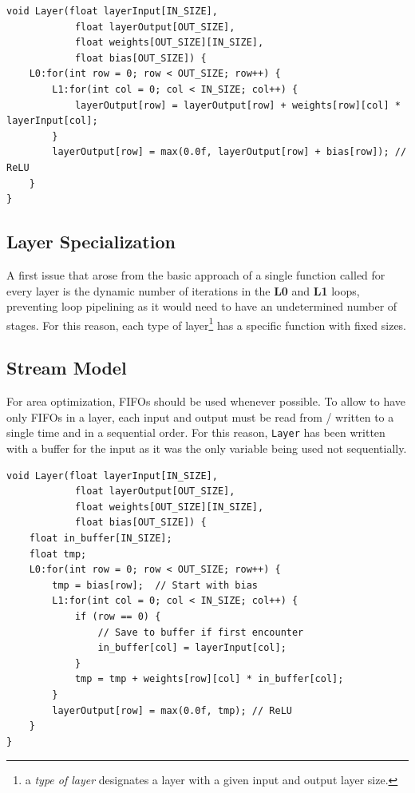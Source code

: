 \documentclass[11pt,a4paper]{article}
\begin{document}
\begin{listing}[htbp]
\begin{minipage}{\linewidth}
\begin{lstlisting}[style=cppstyle]
void Layer(float layerInput[IN_SIZE],
            float layerOutput[OUT_SIZE],
            float weights[OUT_SIZE][IN_SIZE],
            float bias[OUT_SIZE]) {
    L0:for(int row = 0; row < OUT_SIZE; row++) {
        L1:for(int col = 0; col < IN_SIZE; col++) {
            layerOutput[row] = layerOutput[row] + weights[row][col] * layerInput[col];
        }
        layerOutput[row] = max(0.0f, layerOutput[row] + bias[row]); // ReLU
    }
}
\end{lstlisting}
\end{minipage}
\end{listing}

\subsection{Layer Specialization}
\label{sec:layer_specialization}
A first issue that arose from the basic approach of a single function called for every layer is the dynamic number of iterations in the \textbf{L0} and \textbf{L1} loops, preventing loop pipelining as it would need to have an undetermined number of stages. For this reason, each type of layer\footnote{a \textit{type of layer} designates a layer with a given input and output layer size.} has a specific function with fixed sizes.

\subsection{Stream Model}
\label{sec:stream_model}
For area optimization, FIFOs should be used whenever possible. To allow to have only FIFOs in a layer, each input and output must be read from / written to a single time and in a sequential order. For this reason, \lstinline[style=cppstyle]{Layer} has been written with a buffer for the input as it was the only variable being used not sequentially.

\begin{listing}[htbp]
\begin{minipage}{\linewidth}
\begin{lstlisting}[style=cppstyle]
void Layer(float layerInput[IN_SIZE],
            float layerOutput[OUT_SIZE],
            float weights[OUT_SIZE][IN_SIZE],
            float bias[OUT_SIZE]) {
    float in_buffer[IN_SIZE];
    float tmp;
    L0:for(int row = 0; row < OUT_SIZE; row++) {
        tmp = bias[row];  // Start with bias
        L1:for(int col = 0; col < IN_SIZE; col++) {
            if (row == 0) {
                // Save to buffer if first encounter
                in_buffer[col] = layerInput[col];
            }
            tmp = tmp + weights[row][col] * in_buffer[col];
        }
        layerOutput[row] = max(0.0f, tmp); // ReLU
    }
}
\end{lstlisting}
\end{minipage}
\end{listing}
\end{document}
